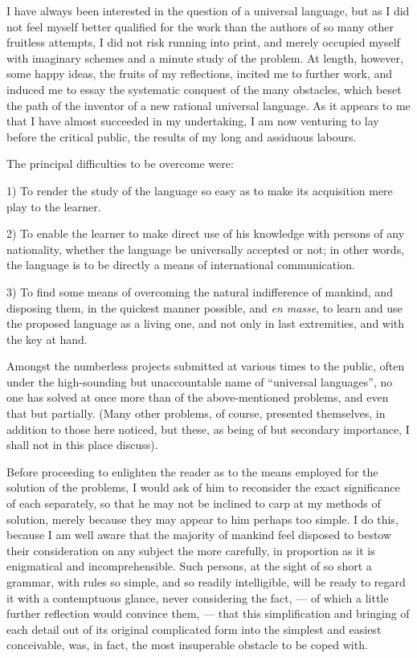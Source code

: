 I have always been interested in the question of a universal language, but as I did not feel myself better qualified for the work than the authors of so many other fruitless attempts, I did not risk running into print, and merely occupied myself with imaginary schemes and a minute study of the problem. At length, however, some happy ideas, the fruits of my reflections, incited me to further work, and induced me to essay the systematic conquest of the many obstacles, which beset the path of the inventor of a new rational universal language. As it appears to me that I have almost succeeded in my undertaking, I am now venturing to lay before the critical public, the results of my long and assiduous labours.

The principal difficulties to be overcome were:

1) To render the study of the language so easy as to make its acquisition mere play to the learner.

2) To enable the learner to make direct use of his knowledge with persons of any nationality, whether the language be universally accepted or not; in other words, the language is to be directly a means of international communication.

3) To find some means of overcoming the natural indifference of mankind, and disposing them, in the quickest manner possible, and \emph{en masse}, to learn and use the proposed language as a living one, and not only in last extremities, and with the key at hand.

Amongst the numberless projects submitted at various times to the public, often under the high-sounding but unaccountable name of “universal languages”, no one has solved at once more than  of the above-mentioned problems, and even that but partially. (Many other problems, of course, presented themselves, in addition to those here noticed, but these, as being of but secondary importance, I shall not in this place discuss).

Before proceeding to enlighten the reader as to the means employed for the solution of the problems, I would ask of him to reconsider the exact significance of each separately, so that he may not be inclined to carp at my methods of solution, merely because they may appear to him perhaps too simple. I do this, because I am well aware that the majority of mankind feel disposed to bestow their consideration on any subject the more carefully, in proportion as it is enigmatical and incomprehensible. Such persons, at the sight of so short a grammar, with rules so simple, and so readily intelligible, will be ready to regard it with a contemptuous glance, never considering the fact, --- of which a little further reflection would convince them, --- that this simplification and bringing of each detail out of its original complicated form into the simplest and easiest conceivable, was, in fact, the most insuperable obstacle to be coped with. 
